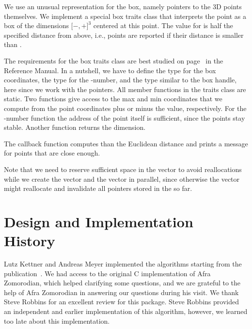 We use an unusual representation for the box, namely pointers to the 3D points
themselves. We implement a special box traits class that interprets
the point as a box of the dimensions $[-$$,+$$]^3$
centered at this point. The value for  is half the specified distance
from above, i.e., points are reported if their distance is smaller
than .

The requirements for the box traits class are best studied on
page~\pageref{ccRef_BoxIntersectionTraits_d} in the Reference Manual. In a
nutshell, we have to define the type  for the box coordinates,
the type  for the -number, and the type 
similar to the box handle, here  since we work with the pointers.
All member functions in the traits class are static. Two functions give
access to the max and min coordinates that we compute from the point
coordinates plus or minus the  value, respectively. For the
-number function the address of the point itself is
sufficient, since the points stay stable. Another function
returns the dimension.

The  callback function computes than the Euclidean
distance and prints a message for points that are close enough.

Note that we need to reserve sufficient space in the 
vector to avoid reallocations while we create the  vector
and the  vector in parallel, since otherwise the
 vector might reallocate and invalidate all pointers
stored in the  so far.


\section{Design and Implementation History}

Lutz Kettner and Andreas Meyer implemented the algorithms starting
from the publication~\cite{cgal:ze-fsbi-02}. We had access to the
original C implementation of Afra Zomorodian, which helped clarifying
some questions, and we are grateful to the help of Afra Zomorodian in
answering our questions during his visit. We thank Steve Robbins for
an excellent review for this package. Steve Robbins provided an
independent and earlier implementation of this algorithm,
however, we learned too late about this implementation.



